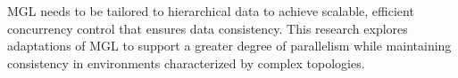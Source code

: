 MGL needs to be tailored to hierarchical data to achieve scalable, efficient concurrency control that ensures data consistency. 
This research explores adaptations of MGL to support a greater degree of parallelism while maintaining consistency in environments characterized by complex topologies. 






